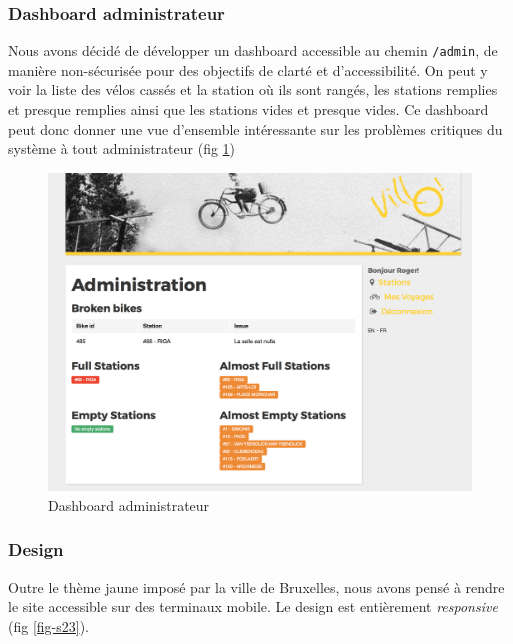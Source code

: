 \documentclass[a4paper]{article}
\begin{document}
    \subsubsection{Dashboard administrateur}
    Nous avons décidé de développer un dashboard accessible au chemin \texttt{/admin}, de manière non-sécurisée pour des objectifs de clarté et d'accessibilité. On peut y voir la liste des vélos cassés et la station où ils sont rangés, les stations remplies et presque remplies ainsi que les stations vides et presque vides. Ce dashboard peut donc donner une vue d'ensemble intéressante sur les problèmes critiques du système à tout administrateur (fig \ref{fig-s22})
    
    \begin{figure}
    \includegraphics[width=\textwidth]{images/s22.png}
    \caption{Dashboard administrateur}
    \label{fig-s22}
    \end{figure}
    
    \subsubsection{Design}
    Outre le thème jaune imposé par la ville de Bruxelles, nous avons pensé à rendre le site accessible sur des terminaux mobile. Le design est entièrement \textit{responsive} (fig \ref{fig-s23}).
    
\end{document}
